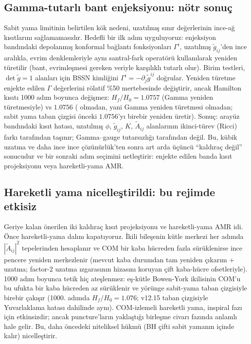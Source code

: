 \subsection{Gamma-tutarlı bant enjeksiyonu: nötr sonuç}

Sabit yama limitinin belirtilen kök nedeni, uzatılmış sınır değerlerinin ince-ağ kısıtlarını sağlamamasıdır. Hedefli bir ilk adım uyguluyoruz: enjeksiyon bandındaki depolanmış konformal bağlantı fonksiyonları $\Gamma^i$, uzatılmış $\tilde g_{ij}$'den ince aralıkla, evrim denklemleriyle aynı santral-fark operatörü kullanılarak yeniden türetilir (bant, evrimleşmesi gereken veriyle karşılıklı tutarlı olur). Birim testleri, $\det\tilde g = 1$ alanları için BSSN kimliğini $\Gamma^i = -\partial_j\tilde g^{ij}$ doğrular. Yeniden türetme enjekte edilen $\Gamma$ değerlerini rölatif \%50 mertebesinde değiştirir, ancak Hamilton kısıtı 1000 adım boyunca değişmez: $H_f/H_0 = 1.0757$ (Gamma yeniden türetmesiyle) vs $1.0756$ ( olmadan, yani Gamma yeniden türetmesi olmadan; sabit yama taban çizgisi önceki $1.0756$'yı birebir yeniden üretir). Sonuç: arayüz bandındaki kısıt hatası, uzatılmış $\phi$, $\tilde g_{ij}$, $K$, $\tilde A_{ij}$ alanlarının ikinci-türev (Ricci) farkı tarafından taşınır; Gamma--gauge tutarsızlığı tarafından değil. Bu, kübik uzatma ve daha ince ince çözünürlük'ten sonra art arda üçüncü ``kaldıraç değil'' sonucudur ve bir sonraki adım seçimini netleştirir: enjekte edilen banda kısıt projeksiyonu veya hareketli-yama AMR.

\subsection{Hareketli yama nicelleştirildi: bu rejimde etkisiz}

Geriye kalan önerilen iki kaldıraç kısıt projeksiyonu ve hareketli-yama
AMR idi. Önce hareketli-yama dalını kapatıyoruz. İkili bileşenin
kütle merkezi her adımda $|\tilde A_{ij}|^2$ tepelerinden hesaplanır ve
COM bir kaba hücreden fazla sürüklenirse ince pencere yeniden
merkezlenir (mevcut kaba durumdan tam yeniden çıkarım + uzatma; factor-2
uzatma ızgarasının hizasını koruyan çift kaba-hücre ofsetleriyle). 1000
adım boyunca tetik hiç ateşlenmez: eş-kütle Bowen-York ikilisinin COM'u
bu ufukta bir kaba hücreden az sürüklenir ve yörünge sabit-yama taban
çizgisiyle birebir çakışır (1000. adımda $H_f/H_0 = 1.076$; v12.15
taban çizgisiyle Yuvarlaklama hatası dahilinde aynı). COM-izlemeli
hareketli yama, inspiral fazı için etkinsizdir; ancak puncture'ların
yaklaştığı birleşme civarı fazında anlamlı hale gelir. Bu, daha
öncedeki niteliksel hükmü (BH çifti sabit yamanın içinde kalır)
nicelleştirir.


